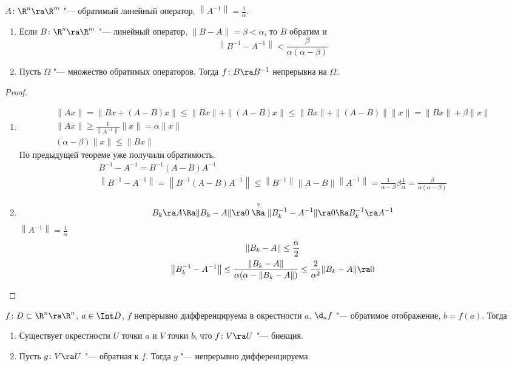 \begin{theorem}
	$A\colon \R^n \ra \R^m$ "--- обратимый линейный оператор, $\left\|A^{-1}\right\| = \frac1\alpha$.
	\begin{enumerate}
	\item
		Если $B\colon \R^n \ra \R^m$ "--- линейный оператор, $\|B - A\| = \beta < \alpha$, то $B$ обратим и
		\[ \left\|B^{-1} - A^{-1}\right\| < \frac{\beta}{\alpha(\alpha - \beta)} \]

	\item
		Пусть $\Omega$ "--- множество обратимых операторов. Тогда $f\colon B \ra B^{-1}$ непрерывна на $\Omega$.
	\end{enumerate}
\end{theorem}
\begin{proof}
	\begin{enumerate}
	\item
		\begin{gather*}
			\|Ax\| = \|Bx + (A-B)x\| \le \|Bx\| + \|(A - B)x\| \le \|Bx\| + \|(A - B)\| \|x\| = \|Bx\| + \beta \|x\| \\
			\|Ax\| \ge \frac{1}{\left\|A^{-1}\right\|} \|x\| = \alpha \|x\| \\
			(\alpha - \beta) \|x\| \le \|Bx\|
		\end{gather*}
		По предыдущей теореме уже получили обратимость.
		\begin{gather*}
			B^{-1} - A^{-1} = B^{-1} (A - B) A^{-1} \\
			\left\|B^{-1} - A^{-1}\right\| = \left\|B^{-1} (A - B) A^{-1}\right\| \le \left\|B^{-1}\right\| \|A - B\| \left\|A^{-1}\right\|
				= \frac1{\alpha - \beta}\beta\frac1\alpha = \frac{\beta}{\alpha(\alpha - \beta)}
		\end{gather*}

	\item
		\[ B_k \ra A \Ra \|B_k - A\| \ra 0 \stackrel{?}{\Ra} \|B_k^{-1} - A^{-1}\| \ra 0 \Ra B_k^{-1} \ra A^{-1} \]
		$\left\|A^{-1}\right\| = \frac1\alpha$
		\begin{gather*}
			\|B_k - A\| \le \frac{\alpha}2 \\
			\left\|B_k^{-1} - A^{-1}\right\| \le \frac{\|B_k - A\|}{\alpha(\alpha - \|B_k - A\|)} \le \frac{2}{\alpha^2} \|B_k - A\| \ra 0
		\end{gather*}
	\end{enumerate}
\end{proof}

\begin{theorem}
	$f\colon D \subset \R^n \ra \R^n$, $a \in \Int D$, $f$ непрерывно дифференцируема в окрестности $a$, $\d_a f$ "--- обратимое отображение, $b = f(a)$.
	Тогда
	\begin{enumerate}
	\item
		Существует окрестности $U$ точки $a$ и $V$ точки $b$, что $f\colon V \ra U$ "--- биекция.

	\item
		Пусть $g\colon V \ra U$ "--- обратная к $f$. Тогда $g$ "--- непрерывно дифференцируема.
	\end{enumerate}
\end{theorem}


